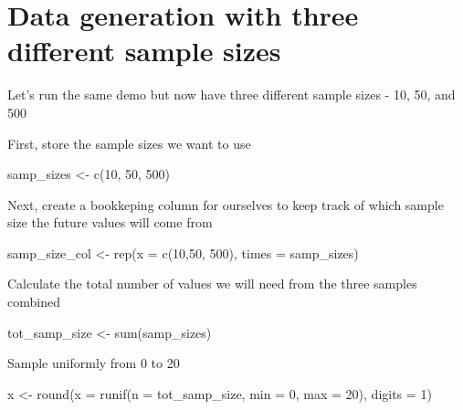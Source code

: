 \documentclass[
]{book}
\newenvironment{Shaded}{\begin{snugshade}}{\end{snugshade}}
\newcommand{\AttributeTok}[1]{\textcolor[rgb]{0.77,0.63,0.00}{#1}}
\newcommand{\DecValTok}[1]{\textcolor[rgb]{0.00,0.00,0.81}{#1}}
\newcommand{\FunctionTok}[1]{\textcolor[rgb]{0.00,0.00,0.00}{#1}}
\newcommand{\NormalTok}[1]{#1}
\newcommand{\OtherTok}[1]{\textcolor[rgb]{0.56,0.35,0.01}{#1}}
\begin{document}
\hypertarget{data-generation-with-three-different-sample-sizes}{%
\section{Data generation with three different sample sizes}\label{data-generation-with-three-different-sample-sizes}}

Let's run the same demo but now have three different sample sizes - 10, 50, and 500

First, store the sample sizes we want to use

\begin{Shaded}
\begin{Highlighting}[]
\NormalTok{samp\_sizes }\OtherTok{\textless{}{-}} \FunctionTok{c}\NormalTok{(}\DecValTok{10}\NormalTok{, }\DecValTok{50}\NormalTok{, }\DecValTok{500}\NormalTok{)}
\end{Highlighting}
\end{Shaded}

Next, create a bookkeping column for ourselves to keep track of which sample size the future values will come from

\begin{Shaded}
\begin{Highlighting}[]
\NormalTok{samp\_size\_col }\OtherTok{\textless{}{-}} \FunctionTok{rep}\NormalTok{(}\AttributeTok{x =} \FunctionTok{c}\NormalTok{(}\DecValTok{10}\NormalTok{,}\DecValTok{50}\NormalTok{, }\DecValTok{500}\NormalTok{), }\AttributeTok{times =}\NormalTok{ samp\_sizes)}
\end{Highlighting}
\end{Shaded}

Calculate the total number of values we will need from the three samples combined

\begin{Shaded}
\begin{Highlighting}[]
\NormalTok{tot\_samp\_size }\OtherTok{\textless{}{-}} \FunctionTok{sum}\NormalTok{(samp\_sizes)}
\end{Highlighting}
\end{Shaded}

Sample uniformly from 0 to 20

\begin{Shaded}
\begin{Highlighting}[]
\NormalTok{x }\OtherTok{\textless{}{-}} \FunctionTok{round}\NormalTok{(}\AttributeTok{x =} \FunctionTok{runif}\NormalTok{(}\AttributeTok{n =}\NormalTok{ tot\_samp\_size, }\AttributeTok{min =} \DecValTok{0}\NormalTok{, }\AttributeTok{max =} \DecValTok{20}\NormalTok{), }\AttributeTok{digits =} \DecValTok{1}\NormalTok{)}
\end{Highlighting}
\end{Shaded}
\end{document}
